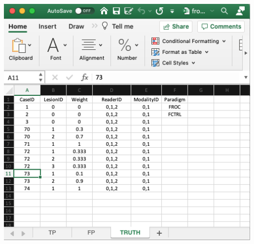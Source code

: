 \documentclass[
]{book}
\begin{document}
\includegraphics[width=1\textwidth,height=\textheight]{images/quick-start/frocCrTruth.png}
\end{document}
